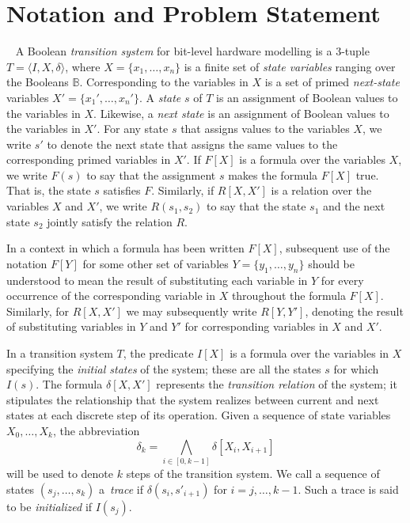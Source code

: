 \section{Notation and Problem Statement}~\label{sec:notation}
%
A Boolean \textit{transition system} for bit-level hardware
modelling is a 3-tuple $T = \langle I,X,\delta \rangle$, where $X = \{x_1,\dots ,x_n\}$
is a finite set of \textit{state variables} ranging over the Booleans $\mathbb{B}$. 
Corresponding to the variables in $X$ is a set of primed \textit{next-state} variables  $X' = \{x_1', \dots, x_n'\}$.
A \textit{state} $s$ of $T$ is an assignment of Boolean values to the variables in $X$. Likewise, a \textit{next state} is an assignment of Boolean values to the variables in $X'$.  For any state $s$ that assigns values to the  variables $X$, we write $s'$ to denote the next state that assigns the same values to the corresponding primed variables in $X'$. If $F[X]$ is a formula over the variables $X$, we write $F(s)$ to say that
the assignment $s$ makes the formula $F[X]$ true. That is, the state $s$ satisfies $F$. Similarly, if $R[X,X']$ is a relation over the variables $X$ and $X'$, we write $R(s_1,s_2)$ to say that the state $s_1$ and the next state $s_2$ jointly satisfy the relation $R$. 

In a context in which a formula has been written $F[X]$, subsequent use of the notation $F[Y]$ for
some other set of variables $Y = \{y_1, \dots, y_n\}$ should be understood to mean the
result of substituting each variable in $Y$ for every occurrence of the corresponding variable in $X$ throughout the formula $F[X]$. Similarly, for $R[X,X']$ we may subsequently write $R[Y,Y']$, denoting the result of substituting variables in $Y$ and $Y'$ for corresponding variables in $X$ and $X'$.

In a transition system $T$, the predicate $I[X]$ is a formula over the variables in 
$X$ specifying the \textit{initial states} of the system; these are all the states 
$s$ for which $I(s)$. The formula $\delta[X,X']$ represents the \textit{transition relation} of the system; it stipulates the relationship that the system
realizes between current and next states at each discrete step of its operation.
Given a sequence of state variables $X_0, \dots, X_k$, the abbreviation \[ \delta_k = \underset{i \in [0,k-1]}{\bigwedge} \delta[X_i, X_{i+1}]\] 
will be used to denote $k$ steps of the transition system.
We call a sequence of states $(s_j,\dots,s_k)$ a~\textit{trace}
if $\delta(s_i,s'_{i{+}1})$ for $i=j,\dots,k-1$.  Such a trace is
said to be \textit{initialized} if $I(s_j)$.
  
